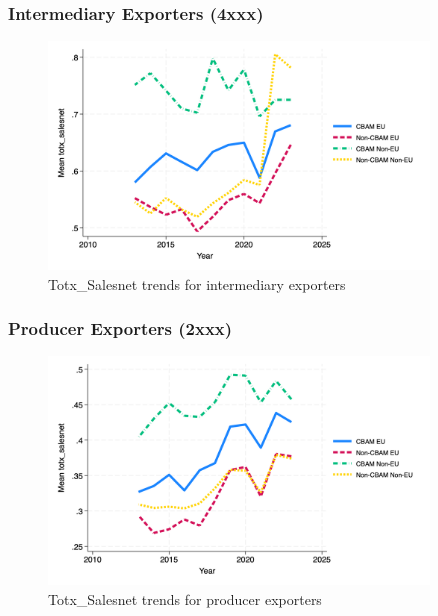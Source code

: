 \documentclass{article}
\begin{document}
\subsubsection{Intermediary Exporters (4xxx)}
\begin{figure}[h!]
\centering
\includegraphics[width=0.9\textwidth]{totx_salesnet_ei.png}
\caption{Totx_Salesnet trends for intermediary exporters}
\label{fig:totx_salesnet_ei}
\end{figure}

\subsubsection{Producer Exporters (2xxx)}
\begin{figure}[h!]
\centering
\includegraphics[width=0.9\textwidth]{totx_salesnet_ep.png}
\caption{Totx_Salesnet trends for producer exporters}
\label{fig:totx_salesnet_ep}
\end{figure}
\end{document}
